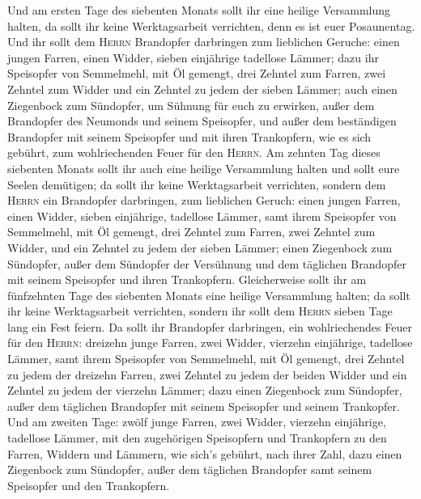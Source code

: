  Und am ersten Tage des siebenten Monats sollt ihr eine
heilige Versammlung halten, da sollt ihr keine Werktagsarbeit
verrichten, denn es ist euer Posaunentag.  Und ihr sollt
dem \textsc{Herrn} Brandopfer darbringen zum lieblichen Geruche: einen
jungen Farren, einen Widder, sieben einjährige tadellose Lämmer;
 dazu ihr Speisopfer von Semmelmehl, mit Öl gemengt, drei
Zehntel zum Farren, zwei Zehntel zum Widder  und ein
Zehntel zu jedem der sieben Lämmer;  auch einen Ziegenbock
zum Sündopfer, um Sühnung für euch zu erwirken,  außer dem
Brandopfer des Neumonds und seinem Speisopfer, und außer dem beständigen
Brandopfer mit seinem Speisopfer und mit ihren Trankopfern, wie es sich
gebührt, zum wohlriechenden Feuer für den \textsc{Herrn}. 
Am zehnten Tag dieses siebenten Monats sollt ihr auch eine heilige
Versammlung halten und sollt eure Seelen demütigen; da sollt ihr keine
Werktagsarbeit verrichten,  sondern dem \textsc{Herrn} ein
Brandopfer darbringen, zum lieblichen Geruch: einen jungen Farren, einen
Widder, sieben einjährige, tadellose Lämmer,  samt ihrem
Speisopfer von Semmelmehl, mit Öl gemengt, drei Zehntel zum Farren, zwei
Zehntel zum Widder,  und ein Zehntel zu jedem der sieben
Lämmer;  einen Ziegenbock zum Sündopfer, außer dem
Sündopfer der Versühnung und dem täglichen Brandopfer mit seinem
Speisopfer und ihren Trankopfern.  Gleicherweise sollt
ihr am fünfzehnten Tage des siebenten Monats eine heilige Versammlung
halten; da sollt ihr keine Werktagsarbeit verrichten, sondern ihr sollt
dem \textsc{Herrn} sieben Tage lang ein Fest feiern.  Da
sollt ihr Brandopfer darbringen, ein wohlriechendes Feuer für den
\textsc{Herrn}: dreizehn junge Farren, zwei Widder, vierzehn einjährige,
tadellose Lämmer,  samt ihrem Speisopfer von Semmelmehl,
mit Öl gemengt, drei Zehntel zu jedem der dreizehn Farren,
 zwei Zehntel zu jedem der beiden Widder und ein Zehntel
zu jedem der vierzehn Lämmer;  dazu einen Ziegenbock zum
Sündopfer, außer dem täglichen Brandopfer mit seinem Speisopfer und
seinem Trankopfer.  Und am zweiten Tage: zwölf junge
Farren, zwei Widder, vierzehn einjährige, tadellose Lämmer,
 mit den zugehörigen Speisopfern und Trankopfern zu den
Farren, Widdern und Lämmern, wie sich's gebührt, nach ihrer Zahl,
 dazu einen Ziegenbock zum Sündopfer, außer dem täglichen
Brandopfer samt seinem Speisopfer und den Trankopfern. 

